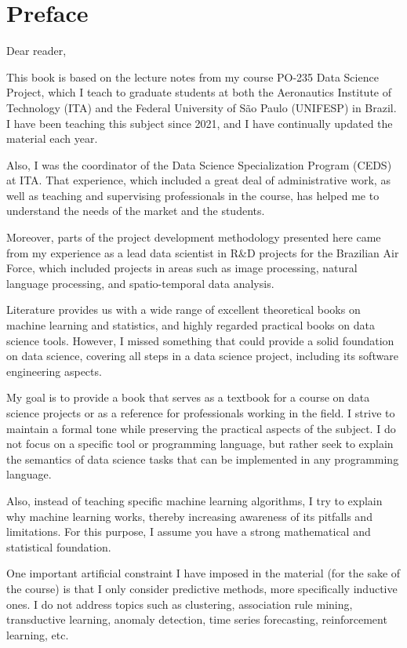 \chapter{Preface}

\noindent Dear reader, \vspace{1em}

This book is based on the lecture notes from my course PO-235 Data Science Project, which
I teach to graduate students at both the Aeronautics Institute of Technology (ITA) and the
Federal University of São Paulo (UNIFESP) in Brazil.  I have been teaching this subject
since 2021, and I have continually updated the material each year.

Also, I was the coordinator of the Data Science Specialization Program (CEDS) at ITA.
That experience, which included a great deal of administrative work, as well as teaching and
supervising professionals in the course, has helped me to understand the needs of the
market and the students.

Moreover, parts of the project development methodology presented here came from my
experience as a lead data scientist in R\&D projects for the Brazilian Air Force,
which included projects in areas such as image processing, natural language processing,
and spatio-temporal data analysis.

Literature provides us with a wide range of excellent theoretical books on machine learning and
statistics, and highly regarded practical books on data science tools.  However, I missed
something that could provide a solid foundation on data science, covering all steps in a
data science project, including its software engineering aspects.

My goal is to provide a book that serves as a textbook for a course on data science
projects or as a reference for professionals working in the field.  I strive to maintain a
formal tone while preserving the practical aspects of the subject.  I do not focus on
a specific tool or programming language, but rather seek to explain the semantics of data
science tasks that can be implemented in any programming language.

Also, instead of teaching specific machine learning algorithms, I try to explain why
machine learning works, thereby increasing awareness of its pitfalls and limitations.
For this purpose, I assume you have a strong mathematical and statistical foundation.

One important artificial constraint I have imposed in the material (for the sake of the
course) is that I only consider predictive methods, more specifically inductive ones. I do
not address topics such as clustering, association rule mining, transductive learning,
anomaly detection, time series forecasting, reinforcement learning, etc.

